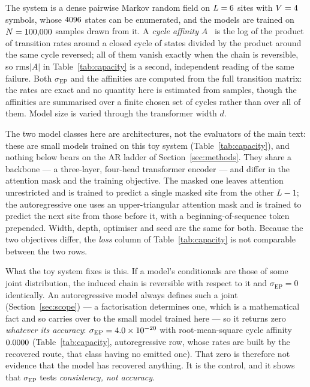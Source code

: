 \documentclass[11pt]{article}
\newcommand{\sigEP}{\sigma_{\mathrm{EP}}}
\begin{document}
The system is a dense pairwise Markov random field on $L = 6$ sites with
$V = 4$ symbols, whose $4096$ states can be enumerated, and the
models are trained on $N = 100{,}000$ samples drawn from it.  A \emph{cycle
affinity} $A$~\cite{schnakenberg} is the log of the product of transition
rates around a closed cycle of states divided by the product around the same
cycle reversed; all of them vanish exactly when the chain is reversible, so
$\mathrm{rms}|A|$ in Table~\ref{tab:capacity} is a second, independent
reading of the same failure.  Both $\sigEP$ and the affinities are computed
from the full transition matrix: the rates are exact and no quantity here is
estimated from samples, though the affinities are summarised over a finite
chosen set of cycles rather than over all of them.  Model size is varied
through the transformer width $d$.

The two model classes here are architectures, not the evaluators of the main
text: these are small models trained on this toy system
(Table~\ref{tab:capacity}), and nothing below bears on the AR ladder of
Section~\ref{sec:methods}.  They share a backbone --- a three-layer,
four-head transformer encoder --- and differ in the attention mask and the
training objective.  The masked one leaves attention unrestricted and is
trained to predict a single masked site from the other $L-1$; the
autoregressive one uses an upper-triangular attention mask and is trained to
predict the next site from those before it, with a beginning-of-sequence
token prepended.  Width, depth, optimiser and seed are the same for both.
Because the two objectives differ, the \emph{loss} column of
Table~\ref{tab:capacity} is not comparable between the two rows.

What the toy system fixes is this.  If a model's conditionals are those of
some joint distribution, the induced chain is reversible with respect to it and
$\sigEP = 0$ identically.  An autoregressive model always defines such a joint
(Section~\ref{sec:scope}) --- a factorisation determines one, which is a
mathematical fact and so carries over to the small model trained here --- so
it returns zero \emph{whatever its accuracy}: $\sigEP = \ToySigmaAR$ with
root-mean-square cycle affinity $0.0000$ (Table~\ref{tab:capacity},
autoregressive row, whose rates are built by the recovered route, that class
having no emitted one).  That
zero is therefore not evidence that the model has recovered anything.  It is
the control, and it shows that $\sigEP$ tests \emph{consistency, not accuracy}.
\end{document}
